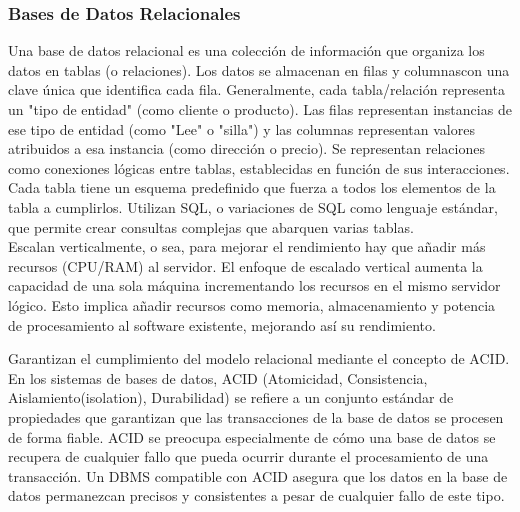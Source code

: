 \documentclass[12pt]{book}
\begin{document}
\subsubsection{Bases de Datos Relacionales}
Una base de datos relacional es una colección de información que organiza los datos en tablas (o relaciones). Los datos se almacenan en filas y columnascon una clave única que identifica cada fila. 
Generalmente, cada tabla/relación representa un "tipo de entidad" (como cliente o producto). Las filas representan instancias de ese tipo de entidad (como "Lee" o "silla") y las columnas representan valores atribuidos a esa instancia (como dirección o precio).
Se representan relaciones como conexiones lógicas entre tablas, establecidas en función de sus interacciones.
Cada tabla tiene un esquema predefinido que fuerza a todos los elementos de la tabla a cumplirlos. Utilizan SQL, o variaciones de SQL como lenguaje estándar, que permite crear consultas complejas que abarquen varias tablas.\\

Escalan verticalmente, o sea, para mejorar el rendimiento hay que añadir más recursos (CPU/RAM) al servidor. El enfoque de escalado vertical aumenta la capacidad de una sola máquina incrementando los recursos en el mismo servidor lógico. Esto implica añadir recursos como memoria, almacenamiento y potencia de procesamiento al software existente, mejorando así su rendimiento.

Garantizan el cumplimiento del modelo relacional mediante el concepto de ACID.\\
En los sistemas de bases de datos, ACID (Atomicidad, Consistencia, Aislamiento(isolation), Durabilidad) se refiere a un conjunto estándar de propiedades que garantizan que las transacciones de la base de datos se procesen de forma fiable.
ACID se preocupa especialmente de cómo una base de datos se recupera de cualquier fallo que pueda ocurrir durante el procesamiento de una transacción. Un DBMS compatible con ACID asegura que los datos en la base de datos permanezcan precisos y consistentes a pesar de cualquier fallo de este tipo.
\end{document}
